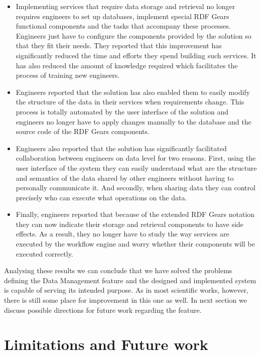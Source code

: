 \begin{itemize}

\item Implementing services that require data storage and retrieval no longer requires engineers to set up databases, implement special RDF Gears functional components and the tasks that accompany these processes. Engineers just have to configure the components provided by the solution so that they fit their needs. They reported that this improvement has significantly reduced the time and efforts they spend building such services. It has also reduced the amount of knowledge required which facilitates the process of training new engineers.

\item Engineers reported that the solution has also enabled them to easily modify the structure of the data in their services when requirements change. This process is totally automated by the user interface of the solution and engineers no longer have to apply changes manually to the database and the source code of the RDF Gears components.

\item Engineers also reported that the solution has significantly facilitated collaboration between engineers on data level for two reasons. First, using the user interface of the system they can easily understand what are the structure and semantics of the data shared by other engineers without having to personally communicate it. And secondly, when sharing data they can control precisely who can execute what operations on the data. 

\item Finally, engineers reported that because of the extended RDF Gears notation they can now indicate their storage and retrieval components to have side effects. As a result, they no longer have to study the way services are executed by the workflow engine and worry whether their components will be executed correctly. 
	
\end{itemize}

Analysing these results we can conclude that we have solved the problems defining the Data Management feature and the designed and implemented system is capable of serving its intended purpose. As in most scientific works, however, there is still some place for improvement in this one as well. In next section we discuss possible directions for future work regarding the feature.

\section{Limitations and Future work}
\label{sec:limitsStorage}

